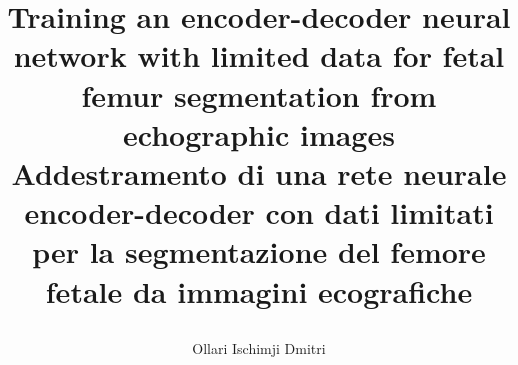 \documentclass[12pt, a4paper, twoside]{book}
\let\origdoublepage\cleardoublepage
\newcommand{\clearemptydoublepage}{%
	\clearpage
	{\pagestyle{empty}\origdoublepage}%
}
\let\cleardoublepage\clearemptydoublepage
\begin{document}
\title{

  \begin{center}
    Training an encoder-decoder neural network with limited data for fetal femur segmentation from echographic images \\
    \large Addestramento di una rete neurale encoder-decoder con dati limitati per la segmentazione del femore fetale da immagini ecografiche
  \end{center}
}
\author{Ollari Ischimji Dmitri}

\maketitle

\cleardoublepage

\tableofcontents
\cleardoublepage
\listoffigures
\cleardoublepage
\listoftables
\cleardoublepage







\cleardoublepage
% 


\end{document}
